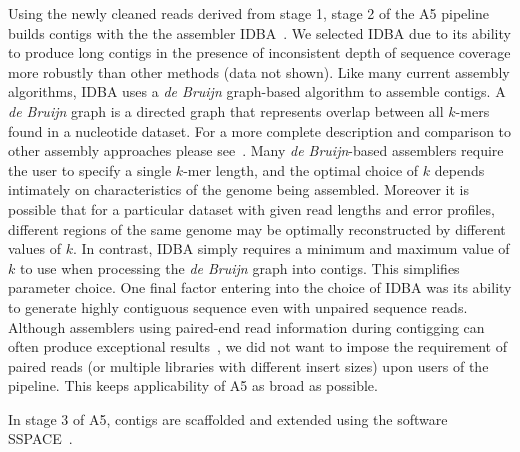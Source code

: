 \documentclass[10pt]{article}
\begin{document}
Using the newly cleaned reads derived from stage 1, stage 2 of the A5 pipeline builds contigs
with the the assembler IDBA~\cite{Peng2010}. We selected IDBA due 
to its ability to produce long contigs in the presence of inconsistent depth of sequence coverage more robustly than other methods (data not shown).
Like many current assembly algorithms, IDBA uses a \emph{de Bruijn} graph-based algorithm to assemble contigs. A \emph{de Bruijn} graph is a directed graph 
that represents overlap between all $k$-mers found in a nucleotide dataset. For a more complete description and comparison to other assembly 
approaches please see~\cite{Pop2009}. Many \emph{de Bruijn}-based assemblers require the user to specify a single $k$-mer length, and the optimal 
choice of $k$ depends intimately on characteristics of the genome being assembled.  Moreover it is possible that for a particular dataset with given 
read lengths and error profiles, different regions of the same genome may be optimally reconstructed by different values of $k$. In contrast, IDBA
simply requires a minimum and maximum value of $k$ to use when processing the \emph{de Bruijn} graph into contigs. This simplifies parameter choice. 
One final factor entering into the choice of IDBA was its 
ability to generate highly contiguous sequence even with unpaired sequence reads. Although assemblers using paired-end read information during 
contigging can often produce exceptional results~\cite{Gnerre2011, SASSY}, we did not want to impose the requirement of paired reads (or multiple
libraries with different insert sizes) upon users of the pipeline. This keeps applicability of A5 as broad as possible.

In stage 3 of A5, contigs are scaffolded and extended using the software SSPACE~\cite{Boetzer2011}. 
\end{document}
